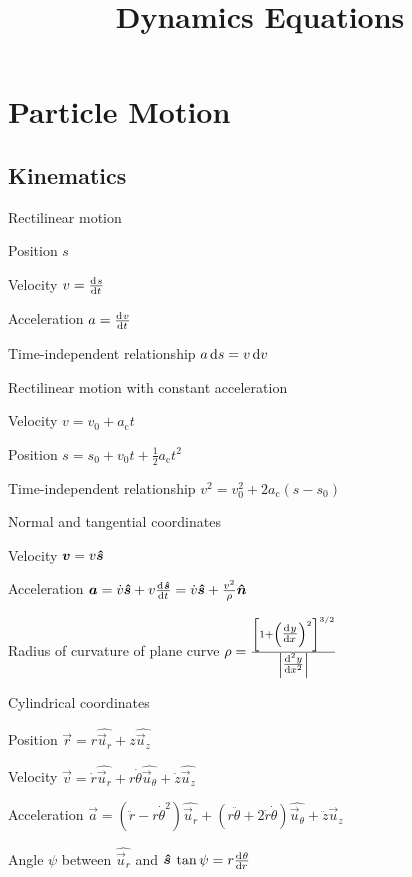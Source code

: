 \documentclass{article}
\title{Dynamics Equations}
\newcommand{\uuvec}[1]{\widehat{\vec{u}_{#1}}}
\begin{document}


\section{Particle Motion}
\label{sec:particle-motion}

\subsection{Kinematics}
\label{sec:particle-kinematics}

\begin{description*}
\item[Rectilinear motion]~
  \begin{description*}
    \item[Position] $s$
    \item[Velocity]
      \(v = \od{s}{t}\)
    \item[Acceleration]
      \(a = \od{v}{t}\)
    \item[Time-independent relationship]
      \(a\dif{s} = v\dif{v}\)
  \end{description*}
\item[Rectilinear motion with constant acceleration]~
  \begin{description*}
  \item[Velocity]
    \(v = v_0 + a_\mathrm{c}t\)
  \item[Position]
    \(s = s_0 + v_0t + \frac12a_\mathrm{c}t^2\)
  \item[Time-independent relationship]
    \(v^2 = v_0^2 + 2a_\mathrm{c}(s-s_0)\)
  \end{description*}
\item[Normal and tangential coordinates]~
  \begin{description*}
  \item[Velocity]
    \(\bm{v} = v\bm{\hat{s}}\)
  \item[Acceleration]
    \(\vec{a} = \dot{v}\uvec{s} + v\od{\uvec{s}}{t}
    = \dot{v}\uvec{s} + \frac{v^2}{\rho}\uvec{n}\)
  \item[Radius of curvature of plane curve]
    \(\rho = \frac{\left[1+\left(\od{y}{x}\right)^2\right]^{3/2}}{\left|\od[2]{y}{x}\right|}\)
  \end{description*}
\item[Cylindrical coordinates]~
  \begin{description*}
  \item[Position]
    \(\vec{r} = r\uuvec{r} + z\uuvec{z}\)
  \item[Velocity]
    \(\vec{v} = \dot{r}\uuvec{r} + r\dot{\theta}\uuvec{\theta} + \dot{z}\uuvec{z}\)
  \item[Acceleration]
    \(\vec{a}
    = (\ddot{r}-r\dot\theta^2)\uuvec{r}
    + (r\ddot\theta+2\dot{r}\dot\theta)\uuvec\theta
    + \ddot{z}\uuvec{z}\)
  \item[Angle $\psi$ between $\uuvec{r}$ and $\bm{\hat{s}}$]
    \(\tan\psi = r\od{\theta}{r}\)
  \end{description*}
\end{description*}
\end{document}

